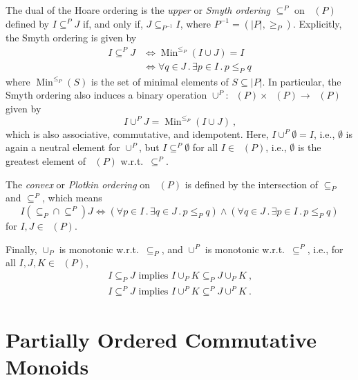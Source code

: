 \documentclass[english]{notes}
\DeclareMathOperator{\Minop}{\mathrm{Min}}
\newcommand{\Min}[1]{\Minop^{#1}}
\DeclareMathOperator{\incsets}{\mathcal{I}}
\DeclareMathOperator{\incfinsets}{\incsets_{\mathrm{fin}}}
\newcommand{\lowersubseteq}[1]{\mathrel{\subseteq_{#1}}}
\newcommand{\uppersubseteq}[1]{\mathrel{\subseteq^{#1}}}
\newcommand{\lowercup}[1]{\mathbin{\cup_{#1}}}
\newcommand{\uppercup}[1]{\mathbin{\cup^{#1}}}
\begin{document}
The dual of the Hoare ordering is the \emph{upper} or \emph{Smyth
  ordering} $\uppersubseteq{P}$ on $\incfinsets(P)$ defined by $I
\uppersubseteq{P} J$ if, and only if, $J \lowersubseteq{P^{-1}} I$, where
$P^{-1} = (|P|, {\geq_P})$.  Explicitly, the Smyth ordering is given
by
\begin{align*}
  I \uppersubseteq{P} J &\iff \Min{\leq_P} (I \cup J) = I
\\
                     &\iff \forall q \in J \,.\, \exists p \in I \,.\, p \leq_P q
\end{align*}
%
where $\Min{\leq_P}(S)$ is the set of minimal elements of $S \subseteq
|P|$.  In particular, the Smyth ordering also
induces a binary operation ${\uppercup{P}} : \incfinsets(P) \times
\incfinsets(P) \to \incfinsets(P)$ given by
%
\begin{equation*}
  I \uppercup{P} J = \Min{\leq_P}(I \cup J)
\ \text{,}
\end{equation*}
%
which is also associative, commutative, and idempotent.  Here,
$I \uppercup{P} \emptyset = I$, i.e., $\emptyset$ is again a neutral
element for $\uppercup{P}$, but $I \uppersubseteq{P} \emptyset$ for
all $I \in \incfinsets(P)$, i.e., $\emptyset$ is the greatest element
of $\incfinsets(P)$ w.r.t.\ $\uppersubseteq{P}$.

The \emph{convex} or \emph{Plotkin ordering} on $\incfinsets(P)$ is
defined by the intersection of $\lowersubseteq{P}$ and
$\uppersubseteq{P}$, which means
%
\begin{equation*}
  I \mathrel{({\lowersubseteq{P}} \cap {\uppersubseteq{P}})} J
\iff
  (\forall p \in I \,.\, \exists q \in J \,.\, p \leq_P q) \land
  (\forall q \in J \,.\, \exists p \in I \,.\, p \leq_P q)
\end{equation*}
%
for $I, J \in \incfinsets(P)$.

Finally, $\lowercup{P}$ is monotonic w.r.t.\ $\lowersubseteq{P}$, and
$\uppercup{P}$ is monotonic w.r.t.\ $\uppersubseteq{P}$, i.e., for all
$I, J, K \in \incfinsets(P)$,
%
\begin{gather*}
  I \lowersubseteq{P} J \text{ implies } I \lowercup{P} K \lowersubseteq{P} J \lowercup{P} K
\ \text{,}
\\
  I \uppersubseteq{P} J \text{ implies } I \uppercup{P} K \uppersubseteq{P} J \uppercup{P} K
\ \text{.}
\end{gather*}


\section{Partially Ordered Commutative Monoids}
\label{sec:poc-monoid}
\end{document}
